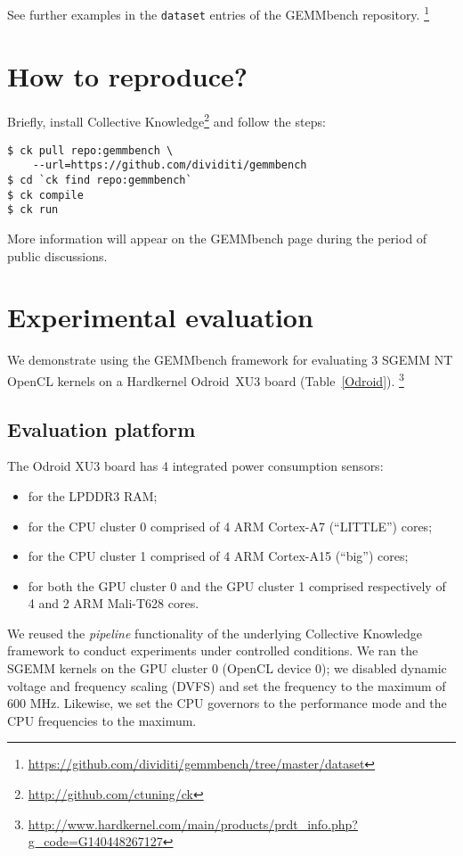\documentclass{acm_proc_article-sp} %
\begin{document}
See further examples in the {\tt dataset} entries of the GEMMbench repository.%
\footnote{\url{https://github.com/dividiti/gemmbench/tree/master/dataset}}


\section{How to reproduce?}

Briefly, install Collective Knowledge\footnote{\url{http://github.com/ctuning/ck}}
and follow the steps:
%
\begin{verbatim}
$ ck pull repo:gemmbench \
    --url=https://github.com/dividiti/gemmbench
$ cd `ck find repo:gemmbench`
$ ck compile
$ ck run
\end{verbatim}
%
More information will appear on the GEMMbench page during the period of public discussions.


\section{Experimental evaluation}

We demonstrate using the GEMMbench framework for evaluating 3 SGEMM NT
OpenCL kernels on a Hardkernel Odroid~XU3 board (Table~\ref{Odroid}).%
\footnote{\url{http://www.hardkernel.com/main/products/prdt_info.php?g_code=G140448267127}}

\subsection{Evaluation platform}

The Odroid XU3 board has 4 integrated power consumption sensors:
%
\begin{itemize}

  \item for the LPDDR3 RAM;

  \item for the CPU cluster 0 comprised of 4 ARM Cortex-A7 (``LITTLE'') cores;

  \item for the CPU cluster 1 comprised of 4 ARM Cortex-A15 (``big'') cores;

  \item for both the GPU cluster 0 and the GPU cluster 1 comprised respectively
  of 4 and 2 ARM Mali-T628 cores.

\end{itemize}
%
We reused the {\em pipeline} functionality of the underlying Collective
Knowledge framework to conduct experiments under controlled conditions.
%
We ran the SGEMM kernels on the GPU cluster 0 (OpenCL device 0); we disabled
dynamic voltage and frequency scaling (DVFS) and set the frequency to the
maximum of 600 MHz.
%
Likewise, we set the CPU governors to the performance mode and the CPU
frequencies to the maximum.
%
\end{document}

